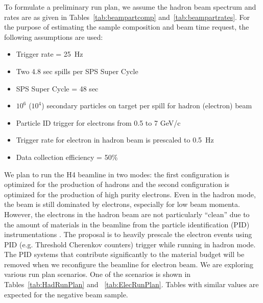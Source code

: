 To formulate a preliminary run plan, we assume the hadron beam spectrum and rates are as given in Tables~\ref{tab:beampartcomp} and~\ref{tab:beampartrates}.   For the purpose of estimating the sample composition and beam time request, the following assumptions are used:
\begin{itemize}
\item { Trigger rate = 25~Hz}
\item { Two 4.8 sec spills per SPS Super Cycle }
\item { SPS Super Cycle = 48 sec}
\item { $10^6$ ($10^4$) secondary particles on target per spill for hadron (electron) beam}
\item { Particle ID trigger for electrons from 0.5 to 7 GeV/c}
\item { Trigger rate for electron in hadron beam is prescaled to 0.5~Hz}
\item { Data collection efficiency = 50\%}
\end{itemize}
We plan to run the H4 beamline in two modes: the first configuration is optimized for the production of hadrons and the second configuration is optimized for the production of high purity electrons. Even in the hadron mode, the beam is still dominated by electrons, especially for low beam momenta. However, the electrons in the hadron beam are not particularly ``clean'' due to the amount of materials in the beamline from the particle identification (PID) instrumentations .  The proposal is to heavily prescale the electron events using PID (e.g. Threshold Cherenkov counters) trigger while running in hadron mode. The PID systems that contribute significantly to the material budget will be removed when we reconfigure the beamline for electron beam.  We are exploring various run plan scenarios. One of the scenarios is shown in Tables~\ref{tab:HadRunPlan} and ~\ref{tab:ElecRunPlan}. Tables with similar values are expected for the negative beam sample. 
